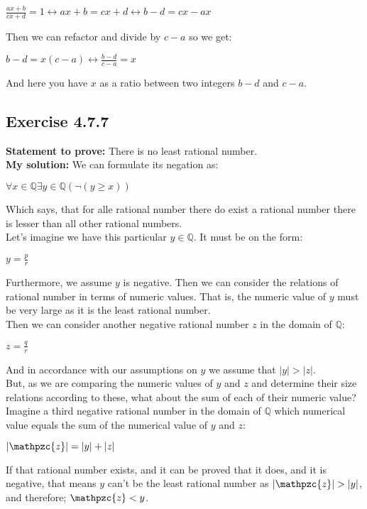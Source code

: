 \documentclass{article}
\newcommand{\cent}[1]{\begin{center}#1\end{center}}
\newcommand{\doubleQ}{\mathbb{Q}}
\newcommand{\In}{\! \in \!}
\newcommand{\script}[1]{\mathpzc{#1}}
\newcommand{\Prove}{\textbf{Statement to prove: }}
\newcommand{\Solution}{\textbf{My solution: }}
\newcommand{\QED}{\boxed{}}
\newcommand{\Exercise}[1]{\subsection*{Exercise #1}}
\begin{document}
	\cent{$\frac{ax+b}{cx+d} = 1 \leftrightarrow ax+b = cx+d \leftrightarrow b - d = cx - ax$}
	
	Then we can refactor and divide by $c-a$ so we get:
	
	\cent{$b -d = x(c-a) \leftrightarrow \frac{b-d}{c-a} = x$}
	
	And here you have $x$ as a ratio between two integers $b-d$ and $c-a$.\\
	\QED
	
	\Exercise{4.7.7}
	
	\Prove
	There is no least rational number.\\
	
	\Solution
	We can formulate its negation as:
	
	\cent{$\forall x \In \doubleQ \exists y \in \doubleQ(\neg(y \geq x))$}
	
	Which says, that for alle rational number there do exist a rational number there is lesser than all other rational numbers.\\
	
	Let's imagine we have this particular $y \in \doubleQ$.  It must be on the form:
	
	\cent{$y = \frac{p}{r}$}
	
	Furthermore, we assume $y$ is negative. Then we can consider the relations of rational number in terms of numeric values. That is, the numeric value of $y$ must be very large as it is the least rational number. \\
	
	Then we can consider another negative rational number $z$ in the domain of $\doubleQ$:
	
	\cent{$z = \frac{q}{r}$}
	
	And in accordance with our assumptions on $y$ we assume that $|y| > |z|$.\\
	
	But, as we are comparing the numeric values of $y$ and $z$ and determine their size relations according to these, what about the sum of each of their numeric value?\\
	
	Imagine a third negative rational number in the domain of $\doubleQ$ which numerical value equals the sum of the numerical value of $y$ and $z$:
	
	\cent{$|\script{z}| = |y| + |z|$}
	
	If that rational number exists, and it can be proved that it does, and it is negative, that means $y$ can't be the least rational number as $|\script{z}| > |y|$, and therefore; $\script{z} < y$.\\
	\QED
	
\end{document}
